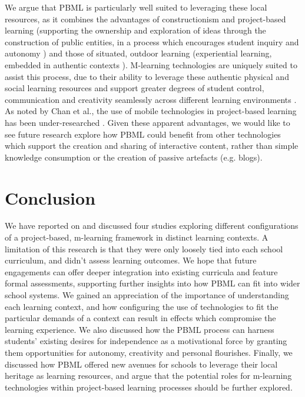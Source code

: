 We argue that PBML is particularly well suited to leveraging these local resources, as it combines the advantages of constructionism and project-based learning (supporting the ownership and exploration of ideas through the construction of public entities, in a process which encourages student inquiry and autonomy \cite{Noss2017, Larmer2015}) and those of situated, outdoor learning (experiential learning, embedded in authentic contexts \cite{Lave1991}). M-learning technologies are uniquely suited to assist this process, due to their ability to leverage these authentic physical and social learning resources and support greater degrees of student control, communication and creativity seamlessly across different learning environments \cite{Sharples2007, Richardson2018}. As noted by Chan et al., the use of mobile technologies in project-based learning has been under-researched \cite{Chan2015}. Given these apparent advantages, we would like to see future research explore how PBML could benefit from other technologies which support the creation and sharing of interactive content, rather than simple knowledge consumption or the creation of passive artefacts (e.g. blogs).

\section{Conclusion}
We have reported on and discussed four studies exploring different configurations of a project-based, m-learning framework in distinct learning contexts. A limitation of this research is that they were only loosely tied into each school curriculum, and didn't assess learning outcomes. We hope that future engagements can offer deeper integration into existing curricula and feature formal assessments, supporting further insights into how PBML can fit into wider school systems. We gained an appreciation of the importance of understanding each learning context, and how configuring the use of technologies to fit the particular demands of a context can result in effects which compromise the learning experience. We also discussed how the PBML process can harness students' existing desires for independence as a motivational force by granting them opportunities for autonomy, creativity and personal flourishes. Finally, we discussed how PBML offered new avenues for schools to leverage their local heritage as learning resources, and argue that the potential roles for m-learning technologies within project-based learning processes should be further explored.
